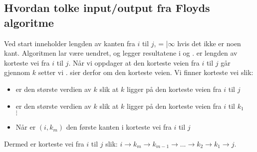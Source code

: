 \subsection{Hvordan tolke input/output fra Floyds algoritme}
Ved start inneholder  lengden av kanten fra $ i $ til $ j $, = |$ \infty $ hvis det ikke er noen kant. Algoritmen lar  være uendret, og legger resultatene i  og .  er lengden av korteste vei fra $ i $ til $ j $. Når vi oppdager at den korteste veien fra $ i $ til $ j $ går gjennom $ k $ setter vi .  sier derfor om den korteste veien. Vi finner korteste vei slik:
\begin{itemize}
\item {} er den største verdien av $ k $ slik at $ k $ ligger på den korteste veien fra $ i $ til $ j $
\item {} er den største verdien av $ k $ slik at $ k $ ligger på den korteste veien fra $ i $ til $ k_1 $
\\ $ \vdots $
\item Når  er $ (i, k_m) $ den første kanten i korteste vei fra $ i $ til $ j $
\end{itemize}
Dermed er korteste vei fra $ i $ til $ j $ slik: $ i \rightarrow k_m \rightarrow k_{m-1} \rightarrow ... \rightarrow k_2 \rightarrow k_1 \rightarrow j $. 